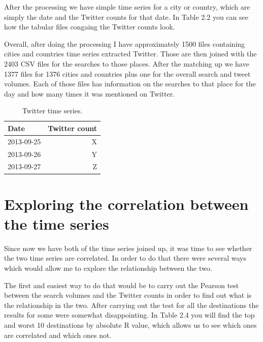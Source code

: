 \documentclass[minf,twoside,singlespacing,parskip,frontabs]{infthesis}
\begin{document}
After the processing we have simple time series for a city or country, which are simply the date and the Twitter counts for that date. In Table 2.2 you can see how the tabular files congaing the Twitter counts look. 

Overall, after doing the processing I have approximately 1500 files containing cities and countries time series extracted Twitter. Those are then joined with the 2403 CSV files for the searches to those places. After the matching up we have 1377 files for 1376 cities and countries plus one for the overall search and tweet volumes. Each of those files has information on the searches to that place for the day and how many times it was mentioned on Twitter. 

\begin{table}[]
\begin{center}
\begin{tabular}{ l | r }
\textbf{Date} & \textbf{Twitter count}\\
\hline
2013-09-25 &  X \\
2013-09-26 &  Y \\
2013-09-27 &  Z \\
\end{tabular}
\end{center}
\caption{Twitter time series.}
\end{table}

\section{Exploring the correlation between the time series}

Since now we have both of the time series joined up, it was time to see whether the two time series are correlated. In order to do that there were several ways which would allow me to explore the relationship between the two. 


The first and easiest way to do that would be to carry out the Pearson test between the search volumes and the Twitter counts in order to find out what is the relationship in the two. After carrying out the test for all the destinations the results for some were somewhat disappointing.  In Table 2.4 you will find the top and worst 10 destinations by absolute R value, which allows us to see which ones are correlated and which ones not.
\end{document}

